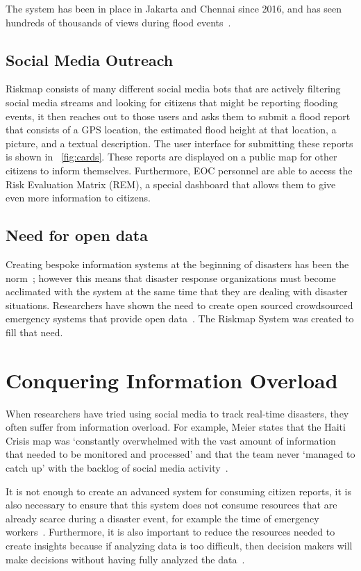   The system has been in place in Jakarta and Chennai since 2016, and has
  seen hundreds of thousands of views during flood
  events~\cite{noveckOpinionElectionsWon2018, oct31ChennaiGetsRain}.

  \subsection{Social Media Outreach}
  Riskmap consists of many different social media bots that are actively
  filtering social media streams and looking for citizens that might be
  reporting flooding events, it then reaches out to those users and asks
  them to submit a flood report that consists of a GPS location, the
  estimated flood height at that location, a picture, and a textual
  description. The user interface for submitting these reports is shown
  in \figurename{}~\ref{fig:cards}. These reports are displayed on a public map for other
  citizens to inform themselves. Furthermore, EOC personnel are able to
  access the Risk Evaluation Matrix (REM), a special dashboard that allows them
  to give even more information to citizens.

  \subsection{Need for open data} Creating bespoke information systems at
  the beginning of disasters has been the
  norm~\cite{aminDataNaturalDisasters2008}; however this means that disaster
  response organizations must become acclimated with the system at the same time
  that they are dealing with disaster situations.  Researchers have shown the
  need to create open sourced crowdsourced emergency systems that provide open
  data~\cite{avvenutiNeedOpeningCrowdsourced2018a}. The Riskmap System was
  created to fill that need.
  
\section{Conquering Information Overload} 
  When researchers have tried using social media to track real-time disasters,
  they often suffer from information overload. For example, Meier states that
  the Haiti Crisis map was `constantly overwhelmed with the vast amount of
  information that needed to be monitored and processed' and that the team never
  `managed to catch up' with the backlog of social media
  activity~\cite{meierDigitalHumanitariansHow2015}.
  
  It is not enough to create an advanced system for consuming citizen reports,
  it is also necessary to ensure that this system does not consume resources
  that are already scarce during a disaster event, for example the time of
  emergency workers~\cite{aminDataNaturalDisasters2008}. Furthermore, it is also
  important to reduce the resources needed to create insights because if
  analyzing data is too difficult, then decision makers will make decisions
  without having fully analyzed the
  data~\cite{quarantelliUrbanVulnerabilityDisasters2003}.
  
